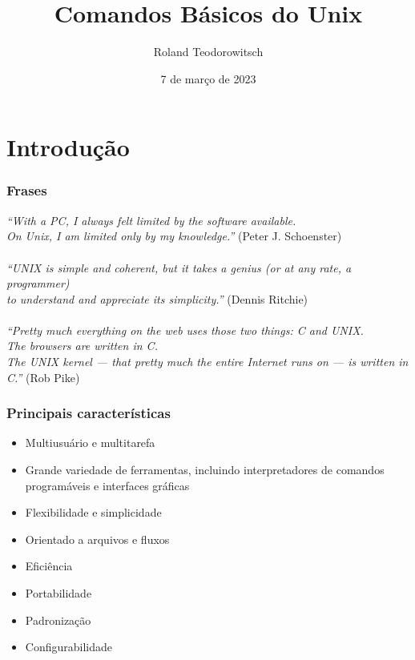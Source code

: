 \documentclass[aspectratio=169]{beamer}
\title[\sc{Comandos Básicos do Unix}]{Comandos Básicos do Unix}
\author[Roland Teodorowitsch]{Roland Teodorowitsch}
\institute[POO - EC - PUCRS]{Programação Orientada a Objetos - ECo - Curso de Engenharia de Computação - PUCRS}
\date{7 de março de 2023}
\begin{document}
\justifying

\begin{frame}
	\titlepage
\end{frame}

\section{Introdução}

\begin{frame}\frametitle{Frases}
\emph{``With a PC, I always felt limited by the software available.\\On Unix, I am limited only by my knowledge.''} (Peter J. Schoenster)\\
~\\
\emph{``UNIX is simple and coherent, but it takes a genius (or at any rate, a programmer)\\to understand and appreciate its simplicity.''} (Dennis Ritchie)\\
~\\
\emph{``Pretty much everything on the web uses those two things: C and UNIX.\\	The browsers are written in C.\\The UNIX kernel --- that pretty much the entire Internet runs on --- is written in C.''} (Rob Pike)\\
\end{frame}

\begin{frame}\frametitle{Principais características}
\begin{itemize}
	\item Multiusuário e multitarefa
	\item Grande variedade de ferramentas, incluindo interpretadores de comandos programáveis e interfaces gráficas
	\item Flexibilidade e simplicidade
	\item Orientado a arquivos e fluxos
	\item Eficiência
	\item Portabilidade
	\item Padronização
	\item Configurabilidade
\end{itemize}
\end{frame}
\end{document}
